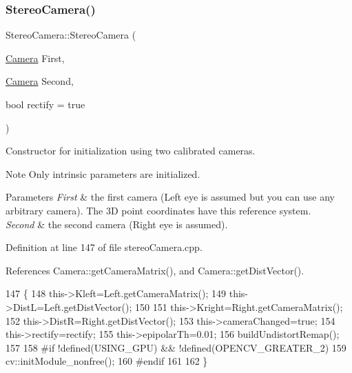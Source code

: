 \subsubsection{\texorpdfstring{Stereo\+Camera()}{StereoCamera()}\hspace{0.1cm}{\footnotesize\ttfamily [3/3]}}
{\footnotesize\ttfamily Stereo\+Camera\+::\+Stereo\+Camera (\begin{DoxyParamCaption}\item[{\hyperlink{classCamera}{Camera}}]{First,  }\item[{\hyperlink{classCamera}{Camera}}]{Second,  }\item[{bool}]{rectify = {\ttfamily true} }\end{DoxyParamCaption})}



Constructor for initialization using two calibrated cameras. 

\begin{DoxyNote}{Note}
Only intrinsic parameters are initialized. 
\end{DoxyNote}

\begin{DoxyParams}{Parameters}
{\em First} & the first camera (Left eye is assumed but you can use any arbitrary camera). The 3D point coordinates have this reference system. \\
\hline
{\em Second} & the second camera (Right eye is assumed). \\
\hline
\end{DoxyParams}


Definition at line 147 of file stereo\+Camera.\+cpp.



References Camera\+::get\+Camera\+Matrix(), and Camera\+::get\+Dist\+Vector().


\begin{DoxyCode}
147                                                                  \{
148     this->Kleft=Left.getCameraMatrix();
149     this->DistL=Left.getDistVector();
150 
151     this->Kright=Right.getCameraMatrix();
152     this->DistR=Right.getDistVector();
153     this->cameraChanged=\textcolor{keyword}{true};
154     this->rectify=rectify;
155     this->epipolarTh=0.01;
156     buildUndistortRemap();
157 
158 \textcolor{preprocessor}{#if !defined(USING\_GPU) && !defined(OPENCV\_GREATER\_2)}
159     cv::initModule\_nonfree();
160 \textcolor{preprocessor}{#endif }
161 
162 \}
\end{DoxyCode}


